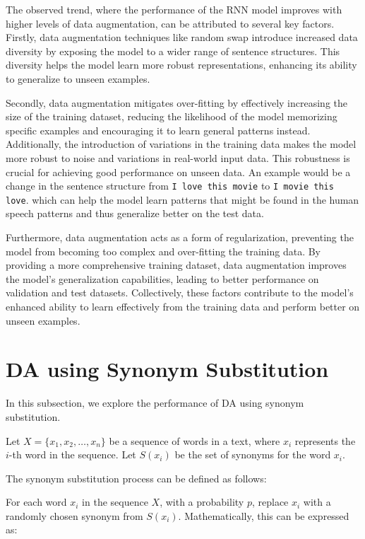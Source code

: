 \documentclass{article}
\newcommand{\code}[1]{\texttt{#1}}
\begin{document}
The observed trend, where the performance of the RNN model improves with higher
levels of data augmentation, can be attributed to several key factors. Firstly,
data augmentation techniques like random swap introduce increased data
diversity by exposing the model to a wider range of sentence
structures. This diversity helps the model learn more robust representations,
enhancing its ability to generalize to unseen examples.

Secondly, data augmentation mitigates over-fitting by effectively increasing
the size of the training dataset, reducing the likelihood of the model
memorizing specific examples and encouraging it to learn general patterns
instead. Additionally, the introduction of variations in the training data
makes the model more robust to noise and variations in real-world input data.
This robustness is crucial for achieving good performance on unseen data. An example
would be a change in the sentence structure from \code{I love this movie} to
\code{I movie this love}. which can help the model learn patterns that might be
found in the human speech patterns and thus generalize better on the test data.

Furthermore, data augmentation acts as a form of regularization, preventing the
model from becoming too complex and over-fitting the training data. By
providing a more comprehensive training dataset, data augmentation improves the
model's generalization capabilities, leading to better performance on
validation and test datasets. Collectively, these factors contribute to the
model's enhanced ability to learn effectively from the training data and
perform better on unseen examples.

\section{DA using Synonym Substitution}

In this subsection, we explore the performance of DA using synonym
substitution.

Let \( X = \{x_1, x_2, \ldots, x_n\} \) be a sequence of words in a text, where
\( x_i \) represents the \( i \)-th word in the sequence. Let \( S(x_i) \) be
the set of synonyms for the word \( x_i \).

The synonym substitution process can be defined as follows:

For each word \( x_i \) in the sequence \( X \), with a probability \( p \),
replace \( x_i \) with a randomly chosen synonym from \( S(x_i) \).
Mathematically, this can be expressed as:
\end{document}
